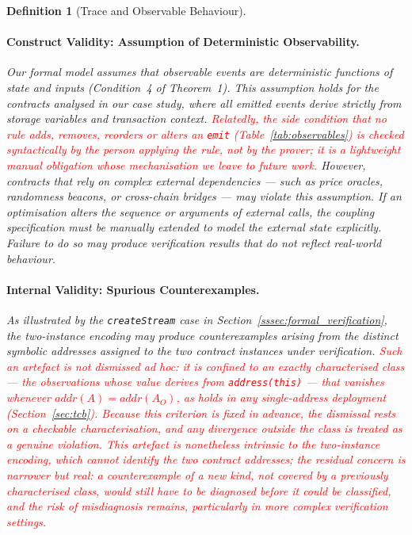 \documentclass[manuscript,screen,review]{acmart}
\newcommand{\revised}[1]{\textcolor{red}{#1}}
\newtheorem{definition}{Definition}
\begin{document}
\begin{definition}[Trace and Observable Behaviour]
\paragraph{Construct Validity: Assumption of Deterministic Observability.}
Our formal model assumes that observable events are deterministic
functions of state and inputs (Condition~4 of Theorem~1). This
assumption holds for the contracts analysed in our case study, where
all emitted events derive strictly from storage variables and
transaction context. \revised{Relatedly, the side condition that no rule adds,
removes, reorders or alters an \texttt{emit} (Table~\ref{tab:observables}) is
checked syntactically by the person applying the rule, not by the prover; it is
a lightweight manual obligation whose mechanisation we leave to future work.}
However, contracts that rely on complex external
dependencies --- such as price oracles, randomness beacons, or
cross-chain bridges --- may violate this assumption. If an
optimisation alters the sequence or arguments of external calls,
the coupling specification must be manually extended to model the
external state explicitly. Failure to do so may produce
verification results that do not reflect real-world behaviour.

\paragraph{Internal Validity: Spurious Counterexamples.}
As illustrated by the \texttt{createStream} case in
Section~\ref{sssec:formal_verification}, the two-instance encoding may
produce counterexamples arising from the distinct symbolic
addresses assigned to the two contract instances under verification.
\revised{Such an artefact is not dismissed ad hoc: it is confined to an
exactly characterised class --- the observations whose value derives from
\texttt{address(this)} --- that vanishes whenever
$\mathit{addr}(A)\!=\!\mathit{addr}(A_O)$, as holds in any single-address
deployment (Section~\ref{sec:tcb}). Because this criterion is fixed in advance,
the dismissal rests on a checkable characterisation, and any divergence outside
the class is treated as a genuine violation. This artefact is nonetheless
intrinsic to the two-instance encoding, which cannot identify the two contract
addresses; the residual concern is narrower but real: a counterexample of a
\emph{new} kind, not covered by a previously characterised class, would still
have to be diagnosed before it could be classified, and the risk of misdiagnosis
remains, particularly in more complex verification settings.}


\end{definition}
\end{document}
